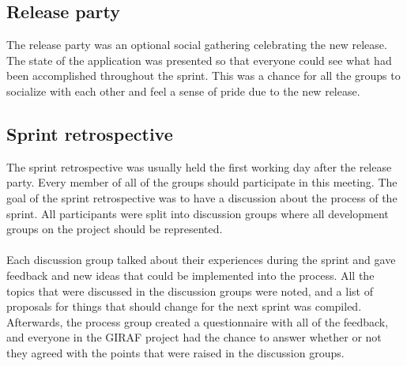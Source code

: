 \subsection{Release party}
The release party was an optional social gathering celebrating the new release. 
The state of the application was presented so that everyone could see what had been accomplished throughout the sprint.
This was a chance for all the groups to socialize with each other and feel a sense of pride due to the new release.

\subsection{Sprint retrospective}
The sprint retrospective was usually held the first working day after the release party.
Every member of all of the groups should participate in this meeting.
The goal of the sprint retrospective was to have a discussion about the process of the sprint.
All participants were split into discussion groups where all development groups on the project should be represented.
\\\\
Each discussion group talked about their experiences during the sprint and gave feedback and new ideas that could be implemented into the process.
All the topics that were discussed in the discussion groups were noted, and a list of proposals for things that should change for the next sprint was compiled.
Afterwards, the process group created a questionnaire with all of the feedback, and everyone in the GIRAF project had the chance to answer whether or not they agreed with the points that were raised in the discussion groups.

